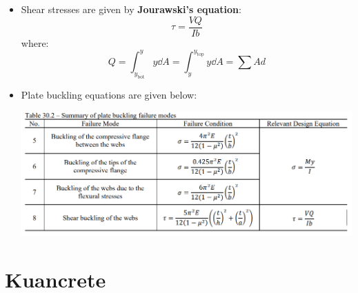 \documentclass{article}
\begin{document}
\begin{itemize}
\begin{itemize}
    \end{itemize}
    \item Shear stresses are given by \textbf{Jourawski's equation}:
    \begin{equation}
        \tau = \frac{VQ}{Ib}
        \label{eq:}
    \end{equation}
    where:
    \begin{equation}
        Q = \int_{y_\text{bot}}^{y} y \dd{A} = \int_y^{y_\text{top}} y \dd{A} = \sum Ad
        \label{eq:}
    \end{equation}
    \item Plate buckling equations are given below:
    \begin{center}
        \includegraphics[width=0.8\linewidth]{plate_buckling.PNG}
    \end{center}
\end{itemize}
\section{Kuancrete}
\end{document}
